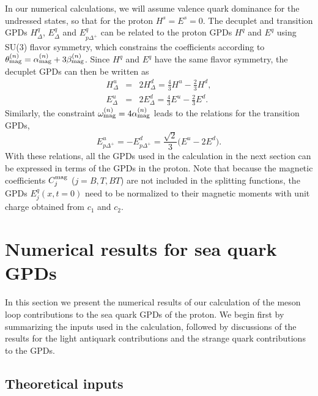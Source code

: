\documentclass[preprintnumbers,prd,superscriptaddress,preprint]{revtex4-1}
\begin{document}
In our numerical calculations, %
we will assume valence quark dominance for the undressed states, so that for the proton $H^s = E^s = 0$. 
The decuplet and transition GPDs $H^q_\Delta$, $E^q_\Delta$ and $E^q_{p\Delta^+}$ can be related to the proton GPDs $H^q$ and $E^q$ using SU(3) flavor symmetry, which constrains the coefficients according to
$\theta_{\rm mag}^{(n)} = \alpha_{\rm mag}^{(n)} + 3\beta_{\rm mag}^{(n)}$.
Since $H^q$ and $E^q$ have the same flavor symmetry, the decuplet GPDs can then be written as
%
\begin{eqnarray}
H^u_{\Delta} &=& 2 H^d_{\Delta} = \frac43 H^u - \frac23 H^d,
\\
E^u_{\Delta} &=& 2 E^d_{\Delta} = \frac43 E^u - \frac23 E^d.
\end{eqnarray}
%
Similarly, the constraint $\omega_{\rm mag}^{(n)}= 4 \alpha_{\rm mag}^{(n)}$ leads to the relations for the transition GPDs,
%
\begin{equation}
E^u_{p\Delta^+}
= -E^d_{p\Delta^+}
= \frac{\sqrt2}{3} \big( E^u - 2 E^d \big).
\end{equation}
%
With these relations, all the GPDs used in the calculation in the next section can be expressed in terms of the GPDs in the proton.
Note that because the magnetic coefficients $C_j^{\rm mag}$ ($j=B,T,BT$) are not included in the splitting functions, the GPDs $E^q_j(x,t=0)$ need to be normalized to their magnetic moments with unit charge obtained from $c_1$ and $c_2$.


\section{Numerical results for sea quark GPDs}
\label{sec.numerical}

In this section we present the numerical results of our calculation of the meson loop contributions to the sea quark GPDs of the proton.
We begin first by summarizing the inputs used in the calculation, followed by discussions of the results for the light antiquark contributions and the strange quark contributions to the GPDs.


\subsection{Theoretical inputs}
\end{document}
